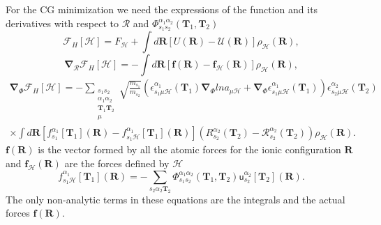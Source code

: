 For the CG minimization we need the expressions of the function and its derivatives with respect to $\boldsymbol{\mathcal{R}}$ and $\Phi_{s_{1}s_{2}}^{\alpha_{1}\alpha_{2}}(\mathbf{T}_{1},\mathbf{T}_{2})$
\begin{equation}
 \label{minim1}
 \mathcal{F}_{H}[\mathcal{H}]=F_{\mathcal{H}}+\int{d\mathbf{R}[U(\mathbf{R})-\mathcal{U}(\mathbf{R})]\rho_{\mathcal{H}}(\mathbf{R})},
\end{equation}
\begin{equation}
 \label{minim2}
 \boldsymbol{\nabla}_{\boldsymbol{\mathcal{R}}}\mathcal{F}_{H}[\mathcal{H}]=-\int{d\mathbf{R}[\mathbf{f}(\mathbf{R})-\mathbf{f}_{\mathcal{H}}(\mathbf{R})]\rho_{\mathcal{H}}(\mathbf{R})},
\end{equation}
\begin{multline}
 \label{minim3}
 \boldsymbol{\nabla}_{\Phi}\mathcal{F}_{H}[\mathcal{H}]=-\sum\limits_{\substack{s_{1}s_{2} \\ \alpha_{1}\alpha_{2} \\ \mathbf{T}_{1}\mathbf{T}_{2} \\ \mu}}\sqrt{\frac{m_{s_{1}}}{m_{s_{
	 2}}}}(\epsilon_{s_{1}\mu\mathcal{H}}^{\alpha_{1}}(\mathbf{T}_{1})\boldsymbol{\nabla}_{\Phi}lna_{\mu\mathcal{H}}+\boldsymbol{\nabla}_{\Phi}\epsilon_{s_{1}\mu\mathcal{H}}^{\alpha_{1}}(\mathbf{T}_{1}))
	\epsilon_{s_{2}\mu\mathcal{H}}^{\alpha_{2}}(\mathbf{T}_{2}) \\ \times\int{d\mathbf{R}[f_{s_{1}}^{\alpha_{1}}[\mathbf{T}_{1}](\mathbf{R})-f_{s_{1}\mathcal{H}}^{\alpha_{1}}[\mathbf{T}_{1}](\mathbf{
 R})](R_{s_{2}}^{\alpha_{2}}(\mathbf{T}_{2})-\mathcal{R}_{s_{2}}^{\alpha_{2}}(\mathbf{T}_{2}))\rho_{\mathcal{H}}(\mathbf{R})}.
\end{multline}
$\mathbf{f}(\mathbf{R})$ is the vector formed by all the atomic forces for the ionic configuration $\mathbf{R}$ and $\mathbf{f}_{\mathcal{H}}(\mathbf{R})$ are the forces defined by $\mathcal{H}$
\begin{equation}
	f_{s_{1}\mathcal{H}}^{\alpha_{1}}[\mathbf{T}_{1}](\mathbf{R})=-\sum_{s_{2}\alpha_{2}\mathbf{T}_{2}}\Phi_{s_{1}s_{2}}^{\alpha_{1}\alpha_{2}}(\mathbf{T}_{1},\mathbf{T}_{2})\mathsf{u}_{s_{2}}^{\alpha_{2}}[\mathbf{
 T}_{2}](\mathbf{R}).
\end{equation}
The only non-analytic terms in these equations are the integrals and the actual forces $\mathbf{f}(\mathbf{R})$. \\

